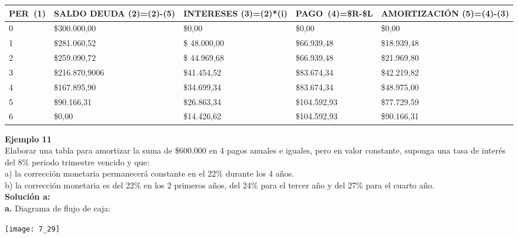\begin{spacing}{1.1}
    \begin{center}
        \begin{tabular}{|p{1cm}|p{2cm}|p{2cm}|p{2cm}|p{3cm}|}
        \hline 
        \rowcolor{white!50}
            \textbf{PER\ (1)} & \textbf{SALDO DEUDA (2)=(2)-(5)} & \textbf{INTERESES  (3)=(2)*(i)}& \textbf{PAGO\ (4)=\$R-\$L }& \textbf{AMORTIZACIÓN  (5)=(4)-(3)} \\ \hline                        

            0 & \$300.000,00 & \$0,00 & \$0,00 & \$0,00 \\ \hline 
            1 & \$281.060,52  &\$ 48.000,00  & \$66.939,48  & \$18.939,48 \\ \hline
            2 & \$259.090,72  &\$ 44.969,68  & \$66.939,48  & \$21.969,80 \\ \hline
            3 & \$216.870,9006 & \$41.454,52  & \$83.674,34 & \$42.219,82 \\ \hline
            4 & \$167.895,90  & \$34.699,34  & \$83.674,34  & \$48.975,00\\ \hline
            5 & \$90.166,31  & \$26.863,34  & \$104.592,93  & \$77.729,59 \\ \hline
            6 & \$0,00  & \$14.426,62  & \$104.592,93  & \$90.166,31 \\ \hline

 
\end{tabular}
\end{center}
\end{spacing}



\textbf{Ejemplo 11}\\
Elaborar una tabla para amortizar la suma de \$600.000 en 4 pagos anuales e iguales, pero en valor constante, suponga una tasa de interés del 8\% periodo trimestre vencido y que:\\

a)	la corrección monetaria permanecerá constante en el 22\% durante los 4 años.\\
b)	la corrección monetaria es del 22\% en los 2 primeros años, del 24\% para el tercer año y del 27\% para el cuarto año.\\

\textbf{Solución a:}\\
\textbf{a.}	Diagrama de flujo de caja:
\begin{center}
	\texttt{[image: 7\_29]}
\end{center}

